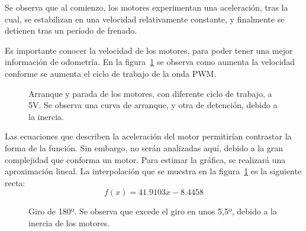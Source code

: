 \documentclass[10pt,a4paper,hidelinks,twocolumn]{article}
\begin{document}
Se observa que al comienzo, los motores experimentan una aceleración, tras la 
cual, se estabilizan en una velocidad relativamente constante, y finalmente se 
detienen tras un período de frenado.

Es importante conocer la velocidad de los motores, para poder tener una mejor 
información de odometría. En la figura~\ref{fig:velocidad-pwm} se observa como 
aumenta la velocidad conforme se aumenta el ciclo de trabajo de la onda PWM.

\begin{figure}[h]
\centering
{}
\caption{Arranque y parada de los motores, con diferente ciclo de trabajo, a 5V.  
Se observa una curva de arranque, y otra de detención, debido a la inercia.
\label{fig:velocidad-pwm}}
	\end{figure}

Las ecuaciones que describen la aceleración del motor permitirían contrastar la 
forma de la función. Sin embargo, no serán analizadas aquí, debido a la gran 
complejidad que conforma un motor. Para estimar la gráfica, se realizará una 
aproximación lineal. La interpolación que se muestra en la 
figura~\ref{fig:velocidad-pwm} es la siguiente recta:
$$ f(x)=41.9103x - 8.4458$$




\begin{figure}[h]
\centering
{}
\caption{Giro de 180º. Se observa que excede el giro en unos 5,5º, debido a la 
inercia de los motores.\label{fig:giro-180}}
\end{figure}
\end{document}
